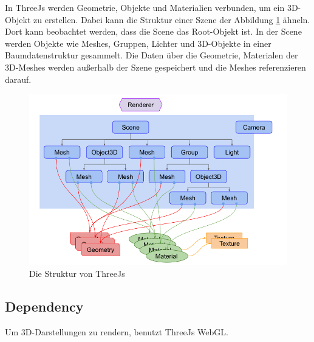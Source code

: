 In ThreeJs werden Geometrie, Objekte und Materialien verbunden, um ein 3D-Objekt zu erstellen. Dabei kann die Struktur einer Szene der Abbildung \ref{fig:tech:front:threejsstructure} ähneln. Dort kann beobachtet werden, dass die Scene das Root-Objekt ist. In der Scene werden Objekte wie Meshes, Gruppen, Lichter und 3D-Objekte in einer Baumdatenstruktur gesammelt. Die Daten über die Geometrie, Materialen der 3D-Meshes werden außerhalb der Szene gespeichert und die Meshes referenzieren darauf.

\cite[ThreeJs fundamentals]{ThreeJsFund}

\begin{figure} [h t]
    \centering
    \includegraphics[scale=0.5]{pics/threejs-structure.png}
    \caption{Die Struktur von ThreeJs \cite{ThreeJsFund}}
    \label{fig:tech:front:threejsstructure}
\end{figure}

\subsection{Dependency}
\label{ch::ThreeJsDependency}
Um 3D-Darstellungen zu rendern, benutzt ThreeJs WebGL.

